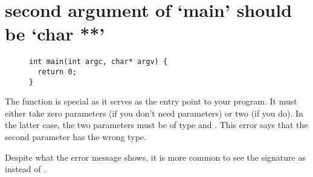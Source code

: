 \section{second argument of `main' should be `char **'}\label{sec:main-second-arg}

\begin{figure}[htb]
\begin{lstlisting}
int main(int argc, char* argv) {
  return 0;
}
\end{lstlisting}
\label{ex:main-second-arg}
\end{figure}

The  function is special as it serves as the entry point to your program.
It must either take zero parameters (if you don't need parameters) or two (if you do).
In the latter case, the two parameters must be of type  and .
This error says that the second parameter has the wrong type.

Despite what the error message shows, it is more common to see the signature as  instead of .
\newpage